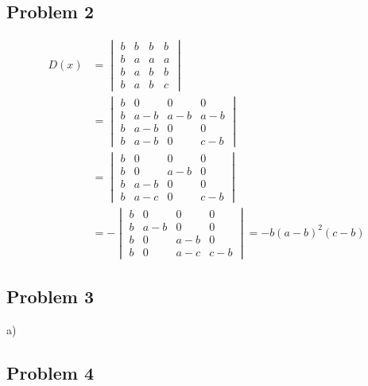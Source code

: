 \documentclass[letterpaper, 11pt]{article}
\newcommand{\1}{\mathds{1}}	%
\theoremstyle{definition}
\begin{document}
\subsection*{Problem 2}

\begin{align*}
    D(x) & = \begin{vmatrix}
                 b & b & b & b \\
                 b & a & a & a \\
                 b & a & b & b \\
                 b & a & b & c
             \end{vmatrix} \\ & =\begin{vmatrix}
        b & 0    & 0   & 0   \\
        b & a -b & a-b & a-b \\
        b & a-b  & 0   & 0   \\
        b & a-b  & 0   & c-b
    \end{vmatrix} \\& =\begin{vmatrix}
        b & 0   & 0   & 0   \\
        b & 0   & a-b & 0   \\
        b & a-b & 0   & 0   \\
        b & a-c & 0   & c-b
    \end{vmatrix} \\& = - \begin{vmatrix}
        b & 0    & 0   & 0   \\
        b & a -b & 0   & 0   \\
        b & 0    & a-b & 0   \\
        b & 0    & a-c & c-b
    \end{vmatrix} = -b(a-b)^{2}(c-b)
\end{align*}

\subsection*{Problem 3}


a)

\subsection*{Problem 4}
\end{document}

